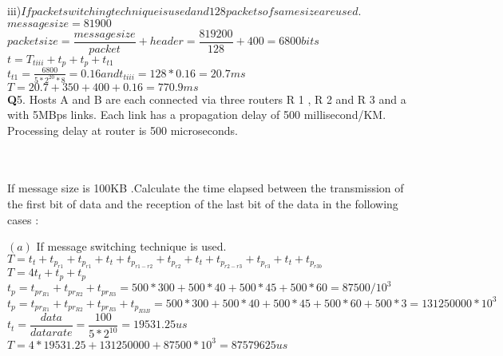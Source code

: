 \documentclass[a4paper,12pt]{article}
\begin{document}
iii)$ If packet switching technique is used and 128 packets of same size are used. $\\

$ message size = 81900 $\\
$ packet size=\dfrac{message size}{packet}+header=\dfrac{819200}{128}+400=6800 bits $\\
$ t = T_{tiii}+t_{p}+t_{p}+t_{t1}$\\
$ t_{t1}=\frac{6800}{5*2^{20}*8}=0.16 and t_{tiii}=128*0.16=20.7 ms $\\
$ T = 20.7+350+400+0.16=770.9 ms $\\



\textbf Q5. Hosts A and B are each connected via three routers R 1 , R 2 and R 3 and a with 5MBps
links. Each link has a propagation delay of 500 millisecond/KM. Processing delay at
router is 500 microseconds.\\

\\\\

If message size is 100KB .Calculate the time elapsed between the transmission of the first
bit of data and the reception of the last bit of the data in the following cases :


$ (a) $ If message switching technique is used.\\


$ T =t_{t}+t_{p_{r1}}+t_{p_{r1}}+t_{t}+t_{p_{r1-r2}}+t_{p_{r2}}+t_{t}+t_{p_{r2-r3}}+t_{p_{r3}}+t_{t}+t_{p_{r3b}}$\\
$ T =4t_{t}+t_{p}+t_{p}$\\
$ t_{p}=t_{pr_{R1}}+t_{pr_{R2}}+t_{pr_{R3}}=500*300+500*40+500*45+500*60=87500/10^{3}$\\
$ t_{p}=t_{pr_{R1}}+t_{pr_{R2}}+t_{pr_{R3}}+t_{p_{R3B}}=500*300+500*40+500*45+500*60+500*3=131250000*10^{3}$\\
$ t_{t}=\dfrac{data}{data rate}=\dfrac{100}{5*2^{10}}=19531.25 us $\\
$ T = 4*19531.25+131250000+87500*10^{3}=87579625 us$\\
\end{document}
